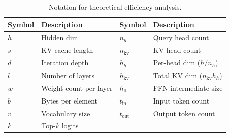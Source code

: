 \begin{table}[ht]
\centering
\caption{Notation for theoretical efficiency analysis.}
\label{tab:eff_notation}
\footnotesize
\setlength{\tabcolsep}{4pt}
\begin{tabular}{@{}ll|ll@{}}
\toprule
\textbf{Symbol} & \textbf{Description} & \textbf{Symbol} & \textbf{Description} \\
\midrule
$h$   & Hidden dim              & $n_h$ & Query head count \\
$s$   & KV cache length         & $n_\text{kv}$ & KV head count \\
$d$   & Iteration depth         & $h_h$ & Per-head dim ($h/n_h$) \\
$l$   & Number of layers        & $h_\text{kv}$ & Total KV dim ($n_\text{kv} h_h$) \\
$w$   & Weight count per layer  & $h_\text{ff}$ & FFN intermediate size \\
$b$   & Bytes per element       & $t_\text{in}$ & Input token count \\
$v$   & Vocabulary size         & $t_\text{out}$ & Output token count \\
$k$   & Top-$k$ logits          & & \\
\bottomrule
\end{tabular}
\end{table}

